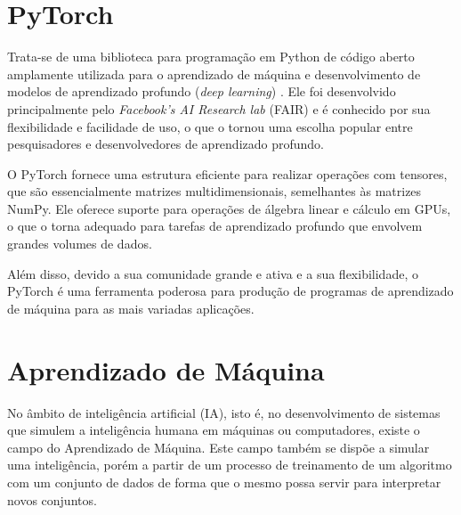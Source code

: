 

\section{PyTorch}

Trata-se de uma biblioteca para programação em Python de código aberto amplamente utilizada para o aprendizado de máquina e desenvolvimento de modelos de aprendizado profundo (\textit{deep learning}) \cite{NEURIPS2019_9015}. Ele foi desenvolvido principalmente pelo \textit{Facebook's AI Research lab} (FAIR) e é conhecido por sua flexibilidade e facilidade de uso, o que o tornou uma escolha popular entre pesquisadores e desenvolvedores de aprendizado profundo.

O PyTorch fornece uma estrutura eficiente para realizar operações com tensores, que são essencialmente matrizes multidimensionais, semelhantes às matrizes NumPy. Ele oferece suporte para operações de álgebra linear e cálculo em GPUs, o que o torna adequado para tarefas de aprendizado profundo que envolvem grandes volumes de dados.

Além disso, devido a sua comunidade grande e ativa e a sua flexibilidade, o PyTorch é uma ferramenta poderosa para produção de programas de aprendizado de máquina para as mais variadas aplicações.

\section{Aprendizado de Máquina}

No âmbito de inteligência artificial (IA), isto é, no desenvolvimento de sistemas que simulem a inteligência humana em máquinas ou computadores, existe o campo do Aprendizado de Máquina. Este campo também se dispõe a simular uma inteligência, porém a partir de um processo de treinamento de um algoritmo com um conjunto de dados de forma que o mesmo possa servir para interpretar novos conjuntos.

